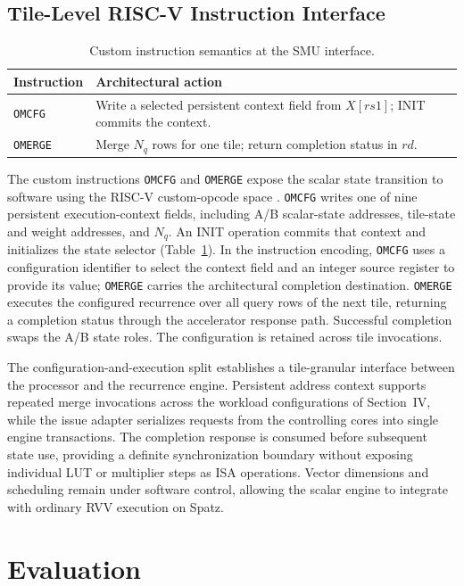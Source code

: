 \documentclass[journal]{IEEEtran}
\begin{document}
\subsection{Tile-Level RISC-V Instruction Interface}
\begin{table}[t]
\centering
\caption{Custom instruction semantics at the SMU interface.}
\label{tab:isa}
\footnotesize
\begin{tabular}{@{}lp{}@{}}
\toprule
Instruction & Architectural action\\
\midrule
\texttt{OMCFG} & Write a selected persistent context field
from $X[rs1]$; INIT commits the context.\\
\texttt{OMERGE} & Merge $N_q$ rows for one tile; return
completion status in $rd$.\\
\bottomrule
\end{tabular}
\end{table}
The custom instructions \texttt{OMCFG} and \texttt{OMERGE} expose the scalar
state transition to software using the RISC-V custom-opcode space
\cite{riscv_unprivileged}. \texttt{OMCFG} writes one of nine persistent
execution-context fields, including A/B scalar-state addresses, tile-state
and weight addresses, and $N_q$. An INIT operation commits that context and
initializes the state selector (Table~\ref{tab:isa}). In the instruction
encoding, \texttt{OMCFG} uses a configuration identifier to select the
context field and an integer source register to provide its value;
\texttt{OMERGE} carries the architectural completion destination. \texttt{OMERGE} executes the configured
recurrence over all query rows of the next tile, returning a completion
status through the accelerator response path. Successful completion swaps
the A/B state roles. The configuration is retained across tile invocations.

The configuration-and-execution split establishes a tile-granular interface
between the processor and the recurrence engine. Persistent address context
supports repeated merge invocations across the workload configurations of
Section~IV, while the issue adapter serializes requests from the controlling
cores into single engine transactions. The completion response is consumed
before subsequent state use, providing a definite synchronization boundary
without exposing individual LUT or multiplier steps as ISA operations.
Vector dimensions and scheduling remain under software control, allowing
the scalar engine to integrate with ordinary RVV execution on Spatz.

\section{Evaluation}
\end{document}

